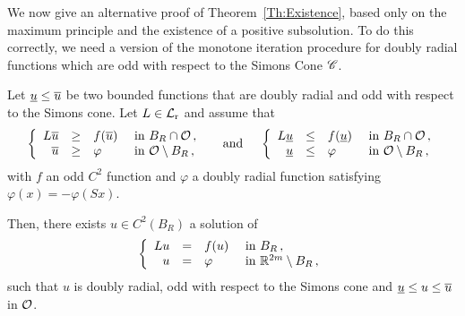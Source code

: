 We now give an alternative proof of Theorem~\ref{Th:Existence}, based only on the maximum principle and the existence of a positive subsolution. To do this correctly, we need a version of the monotone iteration procedure for doubly radial functions which are odd with respect to the Simons Cone $\mathscr{C}$.

\begin{proposition}
	\label{Prop:MonotoneIterationOdd}
	Let $\underline{u} \leq \overline{u}$ be two bounded functions that are doubly radial and odd with respect to the Simons cone. Let $L\in \mathcal{L}_{\mathrm{r}}$  and assume that
	$$
	\left\{\begin{array}{rcll}
	L\overline{u} & \geq & f(\overline{u}) & \textrm{ in } B_R \cap \mathcal{O}\,, \\
	\overline{u} & \geq & \varphi & \textrm{ in } \mathcal{O} \setminus B_R\,, 
	\end{array} \right.
 \quad \textrm{ and } \quad 
	\left\{\begin{array}{rcll}
	L\underline{u} & \leq & f(\underline{u}) & \textrm{ in } B_R \cap \mathcal{O}\,, \\
	\underline{u} & \leq & \varphi & \textrm{ in } \mathcal{O} \setminus B_R\,, 
	\end{array} \right.
	$$
	with $f$ an odd $C^2$ function and $\varphi$ a doubly radial function satisfying $\varphi (x) = - \varphi(Sx)$.
	
	Then, there exists $u\in C^2(B_R)$ a solution of
	$$
	\left\{\begin{array}{rcll}
	Lu & = & f(u) & \textrm{ in } B_R\,, \\
	u &=& \varphi &  \textrm{ in } \mathbb{R}^{2m} \setminus B_R\,, 
	\end{array} \right.
	$$
	such that $u$ is doubly radial, odd with respect to the Simons cone and  $\underline{u} \leq u \leq \overline{u}$ in $\mathcal{O}$.
\end{proposition}


